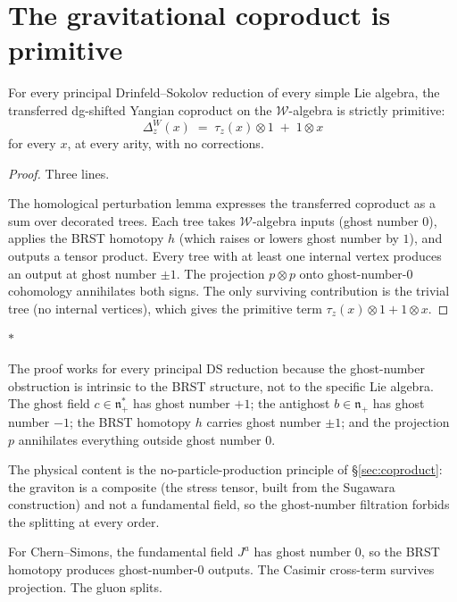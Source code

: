 \documentclass[11pt]{article}
\newcommand{\cW}{\mathcal{W}}
\newcommand{\fn}{\mathfrak{n}}
\newcommand{\sep}{\bigskip\begin{center}$*$\end{center}\medskip}
\begin{document}
\section{The gravitational coproduct is primitive}
\label{sec:primitive-coproduct}

\begin{theorem}
\label{thm:gravitational-primitivity-wn}
For every principal Drinfeld--Sokolov reduction of every simple
Lie algebra, the transferred dg-shifted Yangian coproduct on the
$\cW$-algebra is strictly primitive:
\[
\Delta_z^W(x)
\;=\;
\tau_z(x) \otimes 1
\;+\; 1 \otimes x
\]
for every $x$, at every arity, with no corrections.
\end{theorem}

\begin{proof}
Three lines.

The homological perturbation lemma expresses the transferred
coproduct as a sum over decorated trees.  Each tree takes
$\cW$-algebra inputs (ghost number $0$), applies the BRST
homotopy $h$ (which raises or lowers ghost number by $1$), and
outputs a tensor product.  Every tree with at least one internal
vertex produces an output at ghost number $\pm 1$.  The projection
$p \otimes p$ onto ghost-number-$0$ cohomology annihilates both
signs.  The only surviving contribution is the trivial tree
(no internal vertices), which gives the primitive term
$\tau_z(x) \otimes 1 + 1 \otimes x$.
\end{proof}

\sep

The proof works for every principal DS reduction because the
ghost-number obstruction is intrinsic to the BRST structure, not
to the specific Lie algebra.  The ghost field $c \in \fn_+^*$
has ghost number $+1$; the antighost $b \in \fn_+$ has ghost
number $-1$; the BRST homotopy $h$ carries ghost number $\pm 1$;
and the projection $p$ annihilates everything outside ghost
number $0$.

The physical content is the no-particle-production principle of
\S\ref{sec:coproduct}: the graviton is a composite (the stress
tensor, built from the Sugawara construction) and not a fundamental
field, so the ghost-number filtration forbids the splitting at
every order.

For Chern--Simons, the fundamental field $J^a$ has ghost number
$0$, so the BRST homotopy produces ghost-number-$0$ outputs.
The Casimir cross-term survives projection.  The gluon splits.
\end{document}

